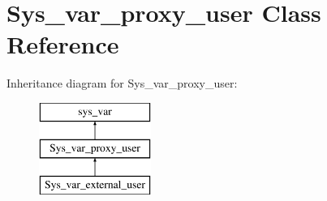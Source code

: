 \hypertarget{classSys__var__proxy__user}{}\section{Sys\+\_\+var\+\_\+proxy\+\_\+user Class Reference}
\label{classSys__var__proxy__user}
Inheritance diagram for Sys\+\_\+var\+\_\+proxy\+\_\+user\+:\begin{figure}[H]
\begin{center}
\leavevmode
\includegraphics[height=3.000000cm]{classSys__var__proxy__user}
\end{center}
\end{figure}
